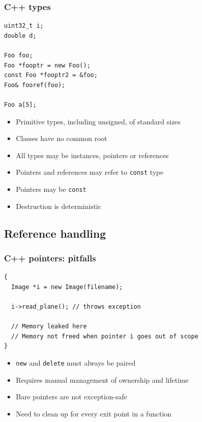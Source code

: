 \documentclass{beamer}
\begin{document}
\begin{frame}[fragile]
  \frametitle{C++ types}
  \begin{lstlisting}
uint32_t i;
double d;

Foo foo;
Foo *fooptr = new Foo();
const Foo *fooptr2 = &foo;
Foo& fooref(foo);

Foo a[5];
\end{lstlisting}
  \begin{itemize}
  \item Primitive types, including unsigned, of standard sizes
  \item Classes have no common root
  \item All types may be instances, pointers or references
  \item Pointers and references may refer to \texttt{const} type
  \item Pointers may be \texttt{const}
  \item Destruction is deterministic
  \end{itemize}
\end{frame}

\subsection{Reference handling}

\begin{frame}[fragile]
  \frametitle{C++ pointers: pitfalls}
  \begin{lstlisting}
{
  Image *i = new Image(filename);

  i->read_plane(); // throws exception

  // Memory leaked here
  // Memory not freed when pointer i goes out of scope
}
\end{lstlisting}
  \begin{itemize}
    \item \texttt{new} and \texttt{delete} must always be paired
    \item Requires manual management of ownership and lifetime
    \item Bare pointers are not exception-safe
    \item Need to clean up for every exit point in a function
  \end{itemize}
\end{frame}
\end{document}
